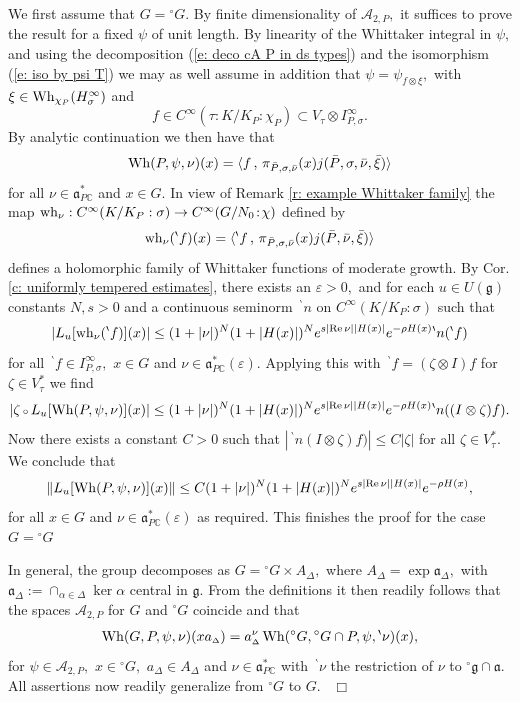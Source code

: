 \documentclass[12pt,a4paper]{article}
\def\proof{\par\noindent{\it Proof.}{\ }{\ }}
\def\qed{~\hfill\hbox{$\Box$}\medbreak}
\def\msy#1{{\mathbb #1}}
\def\C{{\msy C}}
\def\ga{\alpha}
\def\ge{\varepsilon}
\def\gs{\sigma}
\def\gD{\Delta}
\def\got#1{\mathfrak #1}
\def\fa{{\got a}}
\def\fg{{\got g}}
\def\to{\rightarrow}
\def\Re{{\rm Re}\,}
\def\inp#1#2{\langle#1\,,\,#2\rangle}
\def\after{\,{\scriptstyle\circ}\,}
\def\iC{{\scriptscriptstyle \C}}
\def\cA{{\mathcal A}}
\numberwithin{Thm}{section}
\numberwithin{equation}{section}
\def\Wh{{\rm Wh}}
\def\faPdc{{\fa_{P\iC}^*}}
\numberwithin{equation}{section}
\def\bp{\!{\,}^\backprime}
\def\faPdc{\fa_{P\iC}^*}
\def\snorm{n}
\def\IPgs{I_{P,\gs}^\infty}
\def\cAtwoP{\cA_{2,P}}
\def\circG{{}^\circ G}
\def\wh{{\rm wh}}
\def\col{\!:\!}
\def\cchi{\chi}
\begin{document}
\proof
We first assume that $G = \circG.$ By finite dimensionality of $\cAtwoP,$ it suffices to prove the result
for a fixed $\psi$ of unit length. 
By linearity of the Whittaker integral in $\psi,$ and using the decomposition
(\ref{e: deco cA P in ds types}) and the isomorphism (\ref{e: iso by psi T}) we may as well assume 
in addition that $\psi = \psi_{f \otimes \xi},$ with $\xi \in \Wh_{\cchi_P}(H_\gs^\infty)$ and 
$$ 
f \in C^\infty(\tau: K/K_P: \cchi_P) \subset V_\tau \otimes  \IPgs.
$$%
By analytic continuation we then have that 
$$ 
\Wh (P, \psi, \nu) (x) = \inp{f}{\pi_{\bar P, \gs, \bar \nu}(x) j(\bar P, \gs, \bar\nu, \bar\xi)} 
$$%
for all $\nu \in \faPdc$ and $x \in G.$  In view of Remark \ref{r: example Whittaker family}
the map $\wh_\nu: C^\infty(K/K_P:\gs) \to C^\infty(G/N_0\col\cchi)$ defined by 
$$
 \wh_\nu(\bp f )(x)  = \inp{\bp f}{\pi_{\bar P,\gs, \bar\nu}(x) j(\bar P, \bar\nu, \bar\xi)}
$$%
defines a holomorphic family of Whittaker functions of moderate growth.  By Cor. \ref{c: uniformly tempered estimates}, there exists an $\ge>0,$ and for each $u \in U(\fg)$ constants $N,s >0$ and a continuous seminorm $\bp\snorm$ on $C^\infty(K/K_P:\gs)$ such that 
$$ 
|L_u[\wh_\nu(\bp f)](x)|\leq (1 +|\nu|)^N (1 + |H(x)|)^N e^{s|\Re \nu ||H(x)|} e^{-\rho H(x)} \bp\snorm(\bp f)
$$%
for all $\bp f \in \IPgs,$ $x \in G$ and $\nu \in \faPdc(\ge).$ Applying this with $\bp f = (\zeta \otimes I)f$
for $\zeta \in V_\tau^*$ we find 
$$
|\zeta \after L_u[ \Wh (P, \psi, \nu)] (x) | \leq (1 +|\nu|)^N (1 + |H(x)|)^N e^{s|\Re \nu ||H(x)|} e^{-\rho H(x)} \bp\snorm( 
(I \otimes \zeta) f). 
$$%
Now there exists a constant $C > 0$ such that $|\bp\snorm( I \otimes \zeta) f)| \leq C |\zeta|$ 
for all $\zeta \in V_\tau^*.$ We conclude that 
$$ 
\|L_u[\Wh (P, \psi, \nu)] (x) \| \leq  C (1 +|\nu|)^N (1 + |H(x)|)^N e^{s|\Re \nu ||H(x)|} e^{-\rho H(x)},
$$%
for all $x \in G$ and $\nu \in \faPdc(\ge)$ 
as required. This finishes the proof for the case $G = {}^\circ G$ 

In general, the group decomposes as  $G = {}^\circ G \times A_\Delta,$ 
where $A_\Delta = \exp \fa_\gD,$ with $\fa_\gD := \cap_{\ga \in \gD} \ker \ga$ central in $\fg.$ From the definitions it then readily follows that
the spaces $\cAtwoP$ for $G$ and ${}^\circ G$ coincide and that 
$$ 
\Wh(G, P,\psi, \nu)(x a_{\scriptscriptstyle \gD}) = a_{\scriptscriptstyle \gD}^\nu \, \Wh({}^\circ G, {}^\circ G\cap P, \psi, \bp \nu)(x),
$$%
for $\psi\in \cAtwoP,$ $x \in {}^\circ G,$ $a_{\scriptscriptstyle \gD}\in A_\gD$ and $\nu \in \faPdc$
with $\bp \nu$ the restriction of $\nu$ to ${}^\circ\fg \cap \fa.$ All assertions now readily generalize
from ${}^\circ G$ to $G.$ 
\qed
\end{document}

